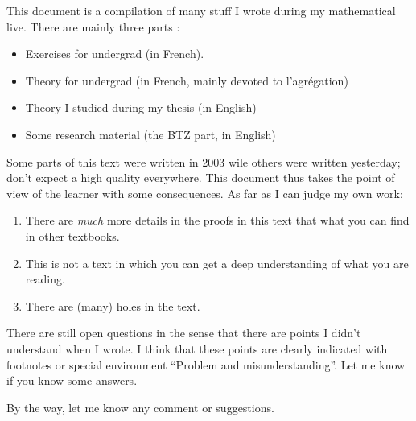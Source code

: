 
This document is a compilation of many stuff I wrote during my mathematical live. There are mainly three parts :
\begin{itemize}
	\item Exercises for undergrad (in French).
	\item Theory for undergrad (in French, mainly devoted to l'agrégation)
	\item Theory I studied during my thesis (in English)
	\item Some research material (the BTZ part, in English)
\end{itemize}
Some parts of this text were written in 2003 wile others were written yesterday; don't expect a high quality everywhere. This document thus takes the point of view of the learner with some consequences. As far as I can judge my own work:
\begin{enumerate}
	\item
	      There are \emph{much} more details in the proofs in this text that what you can find in other textbooks.
	\item
	      This is not a text in which you can get a deep understanding of what you are reading.
	\item
	      There are (many) holes in the text.
\end{enumerate}

There are still open questions in the sense that there are points I didn't understand when I wrote. I think that these points are clearly indicated with footnotes or special environment ``Problem and misunderstanding''. Let me know if you know some answers.

By the way, let me know any comment or suggestions.

